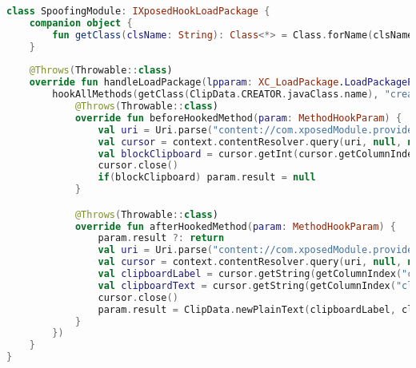\begin{lstlisting}[caption={Kotlin code to deceive Clipboard permission data with the data defined by user in \textit{Deceit} policies.},label={lst:clipboardDeceiver},language=Kotlin,float=*]
class SpoofingModule: IXposedHookLoadPackage {
    companion object {
        fun getClass(clsName: String): Class<*> = Class.forName(clsName, false, lpparam.classLoader)    
    }
    
    @Throws(Throwable::class)
    override fun handleLoadPackage(lpparam: XC_LoadPackage.LoadPackageParam) {
        hookAllMethods(getClass(ClipData.CREATOR.javaClass.name), "createFromParcel", XC_MethodHook() {
            @Throws(Throwable::class)
            override fun beforeHookedMethod(param: MethodHookParam) {
                val uri = Uri.parse("content://com.xposedModule.provider/deceitSettings")
                val cursor = context.contentResolver.query(uri, null, null, null, null) ?: return
                val blockClipboard = cursor.getInt(cursor.getColumnIndex("blockClipboard")
                cursor.close()
                if(blockClipboard) param.result = null
            }

            @Throws(Throwable::class)
            override fun afterHookedMethod(param: MethodHookParam) {
                param.result ?: return
                val uri = Uri.parse("content://com.xposedModule.provider/deceits")
                val cursor = context.contentResolver.query(uri, null, null, null, null) ?: return
                val clipboardLabel = cursor.getString(getColumnIndex("clipboardLabel")) ?: "dummyLabel"
                val clipboardText = cursor.getString(getColumnIndex("clipboardText")) ?: "dummyText"  
                cursor.close()
                param.result = ClipData.newPlainText(clipboardLabel, clipboardText)
            }       
        })   
    }
}
\end{lstlisting}